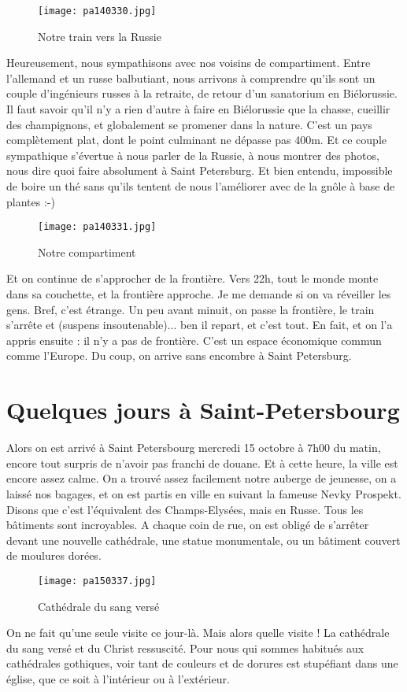 \documentclass{book}
\begin{document}
\begin{figure}[h]
\centering
\texttt{[image: pa140330.jpg]}
\caption*{Notre train vers la Russie}
\end{figure}
Heureusement, nous sympathisons avec nos voisins de compartiment. Entre l'allemand et un russe balbutiant, nous arrivons à comprendre qu'ils sont un couple d'ingénieurs russes à la retraite, de retour d'un sanatorium en Biélorussie. Il faut savoir qu'il n'y a rien d'autre à faire en Biélorussie que la chasse, cueillir des champignons, et globalement se promener dans la nature. C'est un pays complètement plat, dont le point culminant ne dépasse pas 400m.
Et ce couple sympathique s’évertue à nous parler de la Russie, à nous montrer des photos, nous dire quoi faire absolument à Saint Petersburg. Et bien entendu, impossible de boire un thé sans qu'ils tentent de nous l'améliorer avec de la gnôle à base de plantes :-)


\begin{figure}[h]
\centering
\texttt{[image: pa140331.jpg]}
\caption*{Notre compartiment}
\end{figure}
Et on continue de s'approcher de la frontière. Vers 22h, tout le monde monte dans sa couchette, et la frontière approche. Je me demande si on va réveiller les gens. Bref, c'est étrange. Un peu avant minuit, on passe la frontière, le train s'arrête et (suspens insoutenable)... ben il repart, et c'est tout. En fait, et on l'a appris ensuite : il n'y a pas de frontière. C'est un espace économique commun comme l'Europe.
Du coup, on arrive sans encombre à Saint Petersburg.

\chapter{Quelques jours à Saint-Petersbourg}
Alors on est arrivé à Saint Petersbourg mercredi 15 octobre à 7h00 du matin, encore tout surpris de n'avoir pas franchi de douane. Et à cette heure, la ville est encore assez calme.
On a trouvé assez facilement notre auberge de jeunesse, on a laissé nos bagages, et on est partis en ville en suivant la fameuse Nevky Prospekt. Disons que c'est l'équivalent des Champs-Elysées, mais en Russe. Tous les bâtiments sont incroyables. A chaque coin de rue, on est obligé de s'arrêter devant une nouvelle cathédrale, une statue monumentale, ou un bâtiment couvert de moulures dorées.


\begin{figure}[h]
\centering
\texttt{[image: pa150337.jpg]}
\caption*{Cathédrale du sang versé}
\end{figure}
On ne fait qu'une seule visite ce jour-là. Mais alors quelle visite ! La cathédrale du sang versé et du Christ ressuscité. Pour nous qui sommes habitués aux cathédrales gothiques, voir tant de couleurs et de dorures est stupéfiant dans une église, que ce soit à l'intérieur ou à l'extérieur.
\end{document}
